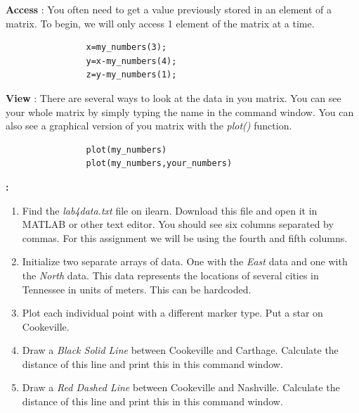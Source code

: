 \documentclass[11pt]{article}
\newcommand{\NUM}{4}
\begin{document}
\begin{description}
\begin{description}
            \item \textbf {Access} : You often need to get a value previously stored in an element of a matrix. To begin, we will only access 1 element of the matrix at a time. 
           
                \begin{verbatim}
                x=my_numbers(3);
                y=x-my_numbers(4);
                z=y-my_numbers(1);
                \end{verbatim}	

	\item \textbf {View} : There are several ways to look at the data in you matrix. You can see your whole matrix by simply typing the name in the command window. You can also see a graphical version of you matrix with the {\it plot()} function. 

                \begin{verbatim}
                plot(my_numbers)
                plot(my_numbers,your_numbers)
                \end{verbatim}	
    
        \end{description}		 
\newpage	
        \item [\textbf{ \Large Assignment}] \textbf{ \Large :}\\

        \begin{enumerate}

	\item Find the {\it lab\NUM\textunderscore data.txt} file on ilearn. Download this file and open it in MATLAB or other text editor. You should see six columns separated by commas. For this assignment we will be using the fourth and fifth columns. 
	
	\item Initialize two separate arrays of data. One with the {\it East} data and one with the {\it North} data. This data represents the locations of several cities in Tennessee in units of meters. This can be hardcoded.
	
	\item Plot each individual point with a different marker type. Put a star on Cookeville. 

	\item Draw a {\it Black Solid Line} between Cookeville and Carthage. Calculate the distance of this line and print this in this command window.	

	\item Draw a  {\it Red Dashed Line} between Cookeville and Nashville. Calculate the distance of this line and print this in this command window.
	

\end{enumerate}
\end{description}
\end{document}
